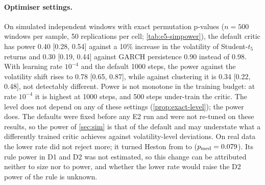 \begin{table}[tbp]
  \centering
  \caption{Alternative split (E5): \TRAIN{} 2018-01-03 to 2021-12-31, \TEST{} 2022-01-03 to
    2025-06-16, same 100 tickers, generators refitted; five synthetic seeds; rule power and
    boundary size from 25 replications per design; $\alpha=0.05$.}
  \label{tab:manual-e5-split}
  \small
\end{table}

\paragraph{Optimiser settings.}
On simulated independent windows with exact permutation p-values ($n=500$ windows per sample, 50
replications per cell; \cref{tab:e5-simpower}), the default critic has power 0.40 [0.28, 0.54]
against a 10\% increase in the volatility of Student-$t_5$ returns and 0.30 [0.19, 0.44] against
GARCH persistence 0.90 instead of 0.98. With learning rate $10^{-4}$ and the default 1000 steps,
the power against the volatility shift rises to 0.78 [0.65, 0.87], while against clustering it
is 0.34 [0.22, 0.48], not detectably different. Power is not monotone in the training budget: at
rate $10^{-4}$ it is highest at 1000 steps, and 500 steps under-train the critic. The level does
not depend on any of these settings (\cref{prop:exact-level}); the power does. The defaults were
fixed before any E2 run and were not re-tuned on these results, so the \WC{} power of
\cref{sec:sim} is that of the default and may understate what a differently trained critic
achieves against volatility-level deviations. On real data the lower rate did not reject more;
it turned Heston from \BAD{} to \INCONCL{} ($p_{\mathrm{med}}=0.079$). Its rule power in D1 and D2 was not
estimated, so this change can be attributed neither to size nor to power, and whether the lower
rate would raise the D2 power of the rule is unknown.

